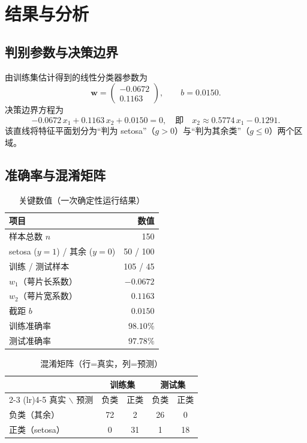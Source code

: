 \documentclass[UTF8, 11pt]{ctexart}
\begin{document}
\section{结果与分析}
\label{sec:results}

\subsection{判别参数与决策边界}
由训练集估计得到的线性分类器参数为
\[
  \mathbf{w} = \begin{pmatrix} -0.0672 \\ 0.1163 \end{pmatrix},
  \qquad b = 0.0150.
\]
决策边界方程为
\[
  -0.0672\,x_1 + 0.1163\,x_2 + 0.0150 = 0,
  \quad\text{即}\quad
  x_2 \approx 0.5774\,x_1 - 0.1291.
\]
该直线将特征平面划分为“判为 setosa”（$g>0$）与“判为其余类”（$g\le 0$）两个区域。

\subsection{准确率与混淆矩阵}

\begin{table}[htbp]
  \centering
  \caption{关键数值（一次确定性运行结果）}
  \label{tab:res}
  \begin{tabular}{l r}
    \toprule
    项目 & 数值 \\
    \midrule
    样本总数 $n$ & 150 \\
    setosa ($y=1$) / 其余 ($y=0$) & 50 / 100 \\
    训练 / 测试样本 & 105 / 45 \\
    $w_1$（萼片长系数） & $-0.0672$ \\
    $w_2$（萼片宽系数） & $0.1163$ \\
    截距 $b$ & $0.0150$ \\
    训练准确率 & $98.10\%$ \\
    测试准确率 & $97.78\%$ \\
    \bottomrule
  \end{tabular}
\end{table}

\begin{table}[htbp]
  \centering
  \caption{混淆矩阵（行=真实，列=预测）}
  \label{tab:cm}
  \begin{tabular}{l cc cc}
    \toprule
    & \multicolumn{2}{c}{训练集} & \multicolumn{2}{c}{测试集} \\
    \cmidrule(lr){2-3} \cmidrule(lr){4-5}
    真实 $\backslash$ 预测 & 负类 & 正类 & 负类 & 正类 \\
    \midrule
    负类（其余） & 72 & 2 & 26 & 0 \\
    正类（setosa） & 0 & 31 & 1 & 18 \\
    \bottomrule
  \end{tabular}
\end{table}
\end{document}
